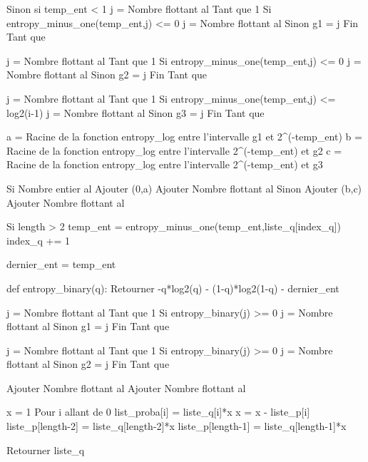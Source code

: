 \documentclass[10pt,a4paper]{article}
\begin{document}
\begin{algorithm}[caption={Integer division.}, label={alg1}]
        Sinon si temp_ent < 1
            j = Nombre flottant al%
            Tant que 1
                Si entropy_minus_one(temp_ent,j) <= 0
                    j = Nombre flottant al%
                Sinon
                    g1 = j
                    Fin Tant que

            j = Nombre flottant al%
            Tant que 1
                Si entropy_minus_one(temp_ent,j) <= 0
                    j = Nombre flottant al%
                Sinon
                    g2 = j
                    Fin Tant que

            j = Nombre flottant al%
            Tant que 1
                Si entropy_minus_one(temp_ent,j) <= log2(i-1)
                    j = Nombre flottant al%
                Sinon
                    g3 = j
                    Fin Tant que

            a = Racine de la fonction entropy_log entre l'intervalle g1 et 2^(-temp_ent)
            b = Racine de la fonction entropy_log entre l'intervalle 2^(-temp_ent) et g2
            c = Racine de la fonction entropy_log entre l'intervalle 2^(-temp_ent) et g3

            Si Nombre entier al%
                Ajouter (0,a) %
                Ajouter Nombre flottant al%
            Sinon
                Ajouter (b,c) %
                Ajouter Nombre flottant al%
        
        Si length > 2
            temp_ent = entropy_minus_one(temp_ent,liste_q[index_q])
            index_q += 1

    dernier_ent = temp_ent

    def entropy_binary(q):
        Retourner -q*log2(q) - (1-q)*log2(1-q) - dernier_ent

    j = Nombre flottant al%
    Tant que 1
        Si entropy_binary(j) >= 0
            j = Nombre flottant al%
        Sinon
            g1 = j
            Fin Tant que

    j = Nombre flottant al%
    Tant que 1
        Si entropy_binary(j) >= 0
            j = Nombre flottant al%
        Sinon
            g2 = j
            Fin Tant que

    Ajouter Nombre flottant al%
    Ajouter Nombre flottant al%

    x = 1
    Pour i allant de 0 %
        list_proba[i] = liste_q[i]*x
        x = x - liste_p[i]
    liste_p[length-2] = liste_q[length-2]*x
    liste_p[length-1] = liste_q[length-1]*x

    Retourner liste_q
        \end{algorithm}
\end{document}
